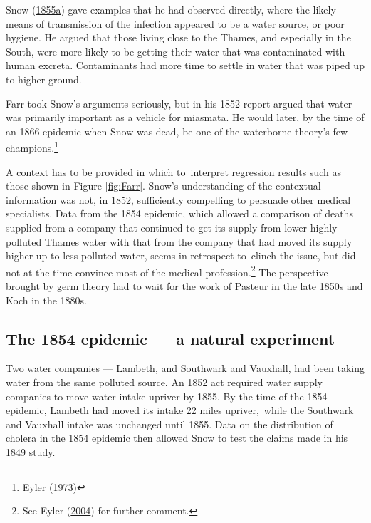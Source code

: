 \documentclass[
  10ptls,
  b5paper]{book}
\begin{document}
Snow (\protect\hyperlink{ref-snow1849mode}{1855a}) gave examples that he had observed directly, where the likely means of transmission of the infection appeared to be a water source, or poor hygiene. He argued that those living close to the Thames, and especially in the South, were more likely to be getting their water that was contaminated with human excreta. Contaminants had more time to settle in water that was piped up to higher ground.

Farr took Snow's arguments seriously, but in his 1852 report argued that water was primarily important as a vehicle for miasmata. He would later, by the time of an 1866 epidemic when Snow was dead, be one of the waterborne theory's few champions.\footnote{Eyler (\protect\hyperlink{ref-eyler1973william}{1973})}

A context has to be provided in which to~interpret regression results such as those shown in Figure \ref{fig:Farr}. Snow's understanding of the contextual information was not, in 1852, sufficiently compelling to persuade other medical specialists. Data from the 1854 epidemic, which allowed a comparison of deaths supplied from a company that continued to get its supply from lower highly polluted Thames water with that from the company that had moved its supply higher up to less polluted water, seems in retrospect to~clinch the issue, but did not at the time convince most of the medical profession.\footnote{See Eyler (\protect\hyperlink{ref-eyler2004changing}{2004}) for further comment.} The perspective brought by germ theory had to wait for the work of Pasteur in the late 1850s and Koch in the 1880s.

\hypertarget{the-1854-epidemic-a-natural-experiment}{%
\subsection*{The 1854 epidemic --- a natural experiment}\label{the-1854-epidemic-a-natural-experiment}}

Two water companies --- Lambeth, and Southwark and Vauxhall, had been taking water from the same polluted source. An 1852 act required water supply companies to move water intake upriver by 1855. By the time of the 1854 epidemic, Lambeth had moved its intake 22 miles upriver,~while the Southwark and Vauxhall intake was unchanged until 1855. Data on the distribution of cholera in the 1854 epidemic then allowed Snow to test the claims made in his 1849 study.
\end{document}
